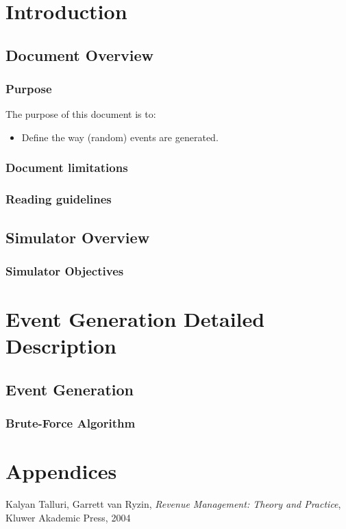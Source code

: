 \documentclass[pdftex,12pt,a4paper]{report}
\begin{document}

\tableofcontents


\chapter{Introduction}

\section{Document Overview}



\subsection{Purpose}
The purpose of this document is to:
\begin{itemize}
  \item Define the way (random) events are generated.
\end{itemize}

\subsection{Document limitations}

\subsection{Reading guidelines}
 
\section{Simulator Overview}

\subsection{Simulator Objectives}
 


\chapter{Event Generation Detailed Description}

\section{Event Generation}

\subsection{Brute-Force Algorithm}



\chapter{Appendices}


\begin{thebibliography}{9}

          Kalyan Talluri, Garrett van Ryzin,
          \emph{Revenue Management: Theory and Practice}, 
          Kluwer Akademic Press, 
          2004

\end{thebibliography}
\end{document}
